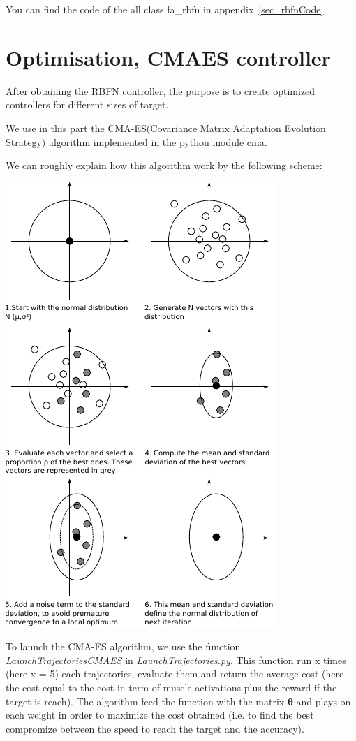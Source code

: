 \documentclass[pdftex,a4paper,11pt]{report}
\begin{document}
You can find the code of the all class fa\_rbfn in appendix~\ref{sec_rbfnCode}.

\section{Optimisation, CMAES controller}
After obtaining the RBFN controller, the purpose is to create optimized controllers for different sizes of target.

We use in this part the CMA-ES(Covariance Matrix Adaptation Evolution Strategy) algorithm implemented in the python module cma.

We can roughly explain how this algorithm work by the following scheme:
\begin{center}
\includegraphics[scale=1.5]{figures/cross-entropy.pdf}
\end{center}
To launch the CMA-ES algorithm, we use the function \textit{LaunchTrajectoriesCMAES} in \textit{LaunchTrajectories.py}. This function run x times (here x = 5) each trajectories, evaluate them and return the average cost (here the cost equal to the cost in term of muscle activations plus the reward if the target is reach). The algorithm feed the function with the matrix $\boldsymbol{\theta}$ and plays on each weight in order to maximize the cost obtained (i.e. to find the best compromize between the speed to reach the target and the accuracy).
\end{document}
